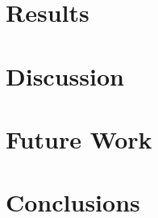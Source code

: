 \documentclass[a4paper,12pt]{article}
\begin{document}
\newpage
\section{Results}
\label{sec:results}


\newpage
\section{Discussion}
\label{sec:discussion}


\newpage
\section{Future Work}
\label{sec:future}


\newpage
\section{Conclusions}
\label{sec:conclusions}




%

\newpage

%

\newpage
\appendix %


\makeatletter
\renewenvironment{theindex}
{\if@twocolumn
    \@restonecolfalse
  \else
    \@restonecoltrue
  \fi
  \twocolumn[\section{\indexname}]%
  \@mkboth{\MakeUppercase\indexname}%
  {\MakeUppercase\indexname}%
  \thispagestyle{plain}\parindent\z@
  \parskip\z@ \@plus .3\p@\relax
  \columnseprule \z@
  \columnsep 35\p@
  \let\item\@idxitem}
{\if@restonecol\onecolumn\else\clearpage\fi}
\makeatother
\printindex
\end{document}
